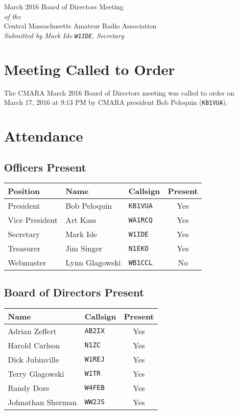 \documentclass[10pt,letterpaper]{article}
\begin{document}
\begin{center}
{\huge March 2016 Board of Directors Meeting}\\
\emph{of the}\\
{\Large Central Massachusetts Amateur Radio Association}\\
\emph{Submitted by Mark Ide \texttt{W1IDE}, Secretary}
\end{center}

\section{Meeting Called to Order}
The CMARA March 2016 Board of Directors meeting was called to order on March 17, 2016 at 9:13 PM by CMARA president Bob Peloquin (\texttt{KB1VUA}).

\section{Attendance}

\subsection{Officers Present}

\begin{tabular}{|l|l|l|c|}
  \hline
  \textbf{Position} & \textbf{Name}  & \textbf{Callsign} & \textbf{Present} \\ \hline
  President         & Bob Peloquin   & \texttt{KB1VUA}   & Yes  \\
  Vice President    & Art Kass       & \texttt{WA1RCQ}   & Yes  \\
  Secretary         & Mark Ide       & \texttt{W1IDE}    & Yes  \\
  Treasurer         & Jim Singer     & \texttt{N1EKO}    & Yes  \\
  Webmaster         & Lynn Glagowski & \texttt{WB1CCL}   & No   \\
  \hline
\end{tabular}

\subsection{Board of Directors Present}

\begin{tabular}{|l|l|c|}
  \hline
  \textbf{Name}     & \textbf{Callsign} & \textbf{Present} \\ \hline
  Adrian Zeffert    & \texttt{AB2IX}    & Yes \\
  Harold Carlson    & \texttt{N1ZC}     & Yes \\
  Dick Jubinville   & \texttt{W1REJ}    & Yes \\
  Terry Glagowski   & \texttt{W1TR}     & Yes \\
  Randy Dore        & \texttt{W4FEB}    & Yes \\
  Johnathan Sherman & \texttt{WW2JS}    & Yes \\
  \hline
\end{tabular}
\end{document}
